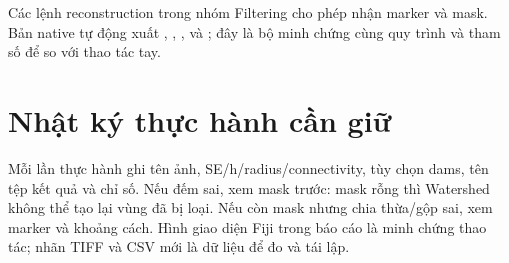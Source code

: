 Các lệnh reconstruction trong nhóm Filtering cho phép nhận marker và mask. Bản native tự động xuất , , ,  và ; đây là bộ minh chứng cùng quy trình và tham số để so với thao tác tay.

\section{Nhật ký thực hành cần giữ}
Mỗi lần thực hành ghi tên ảnh, SE/h/radius/connectivity, tùy chọn dams, tên tệp kết quả và chỉ số. Nếu đếm sai, xem mask trước: mask rỗng thì Watershed không thể tạo lại vùng đã bị loại. Nếu còn mask nhưng chia thừa/gộp sai, xem marker và khoảng cách. Hình giao diện Fiji trong báo cáo là minh chứng thao tác; nhãn TIFF và CSV mới là dữ liệu để đo và tái lập.
